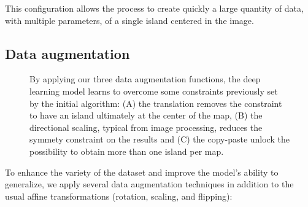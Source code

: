 This configuration allows the process to create quickly a large quantity of data, with multiple parameters, of a single island centered in the image. 

\subsection{Data augmentation}
\label{sec:coral-island-data-augmentation}

\begin{figure}[H]
    \caption{By applying our three data augmentation functions, the deep learning model learns to overcome some constraints previously set by the initial algorithm: (A) the translation removes the constraint to have an island ultimately at the center of the map, (B) the directional scaling, typical from image processing, reduces the symmety constraint on the results and (C) the copy-paste unlock the possibility to obtain more than one island per map.}
    \label{fig:coral-island-cGAN-examples}
\end{figure}

To enhance the variety of the dataset and improve the model's ability to generalize, we apply several data augmentation techniques in addition to the usual affine transformations (rotation, scaling, and flipping):

